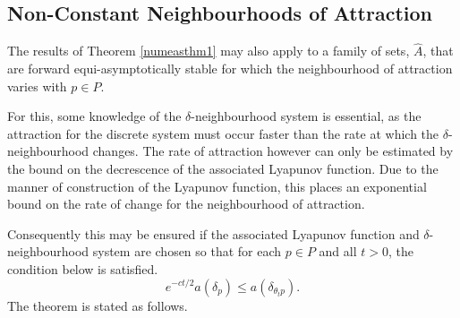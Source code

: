 \subsection{Non-Constant Neighbourhoods of Attraction}

The results of Theorem \ref{numeasthm1} may also apply to a family
of sets, $\hat{A}$, that are forward equi-asymptotically stable
for which the neighbourhood of attraction varies with $p \in P$.

For this, some knowledge of the $\delta$-neighbourhood system is
essential, as the attraction for the discrete system must occur
faster than the rate at which the $\delta$-neighbourhood changes. The rate of
attraction however can only be estimated by the bound on the decrescence of the
associated Lyapunov function. Due to the manner of construction of the Lyapunov
function, this places an exponential bound on the rate of change for the
neighbourhood of attraction.

Consequently this may be ensured if the associated Lyapunov function
and $\delta$-neighbourhood system are chosen so that for each $p
\in P$ and all $t > 0$, the condition below is satisfied.
\begin{equation}
\label{condnhd}
e^{-ct/2} a (\delta_p) \leq a( \delta_{\theta_t p}).
\end{equation}
The theorem is stated as follows.

